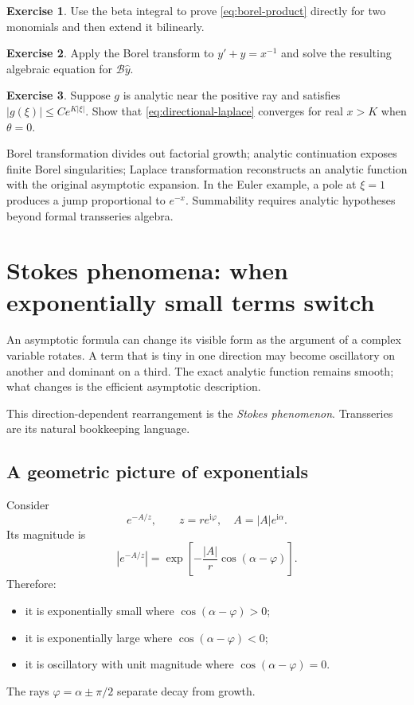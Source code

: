 \documentclass[11pt,openany]{book}
\theoremstyle{definition}
\newtheorem{exercise}{Exercise}[chapter]
\theoremstyle{plain}
\theoremstyle{remark}
\newcommand{\ii}{\mathrm{i}}
\newcommand{\trans}[1]{\widehat{#1}}
\newcommand{\Borel}{\mathcal{B}}
\begin{document}
\begin{exercise}
Use the beta integral to prove \eqref{eq:borel-product} directly for two monomials and then extend it bilinearly.
\end{exercise}

\begin{exercise}
Apply the Borel transform to $y'+y=x^{-1}$ and solve the resulting algebraic equation for $\Borel\trans y$.
\end{exercise}

\begin{exercise}
Suppose $g$ is analytic near the positive ray and satisfies $|g(\xi)|\le Ce^{K|\xi|}$. Show that \eqref{eq:directional-laplace} converges for real $x>K$ when $\theta=0$.
\end{exercise}

\begin{summarybox}
Borel transformation divides out factorial growth; analytic continuation exposes finite Borel singularities; Laplace transformation reconstructs an analytic function with the original asymptotic expansion. In the Euler example, a pole at $\xi=1$ produces a jump proportional to $e^{-x}$. Summability requires analytic hypotheses beyond formal transseries algebra.
\end{summarybox}


\chapter{Stokes phenomena: when exponentially small terms switch}\label{ch:stokes}

An asymptotic formula can change its visible form as the argument of a complex variable rotates. A term that is tiny in one direction may become oscillatory on another and dominant on a third. The exact analytic function remains smooth; what changes is the efficient asymptotic description.

This direction-dependent rearrangement is the \emph{Stokes phenomenon}. Transseries are its natural bookkeeping language.

\section{A geometric picture of exponentials}

Consider
\begin{equation}\label{eq:stokes-exponential}
 e^{-A/z},
 \qquad z=re^{\ii\varphi},\quad A=|A|e^{\ii\alpha}.
\end{equation}
Its magnitude is
\begin{equation}\label{eq:stokes-magnitude}
 \left|e^{-A/z}\right|
 =\exp\left[-\frac{|A|}{r}\cos(\alpha-\varphi)\right].
\end{equation}
Therefore:
\begin{itemize}
 \item it is exponentially small where $\cos(\alpha-\varphi)>0$;
 \item it is exponentially large where $\cos(\alpha-\varphi)<0$;
 \item it is oscillatory with unit magnitude where $\cos(\alpha-\varphi)=0$.
\end{itemize}
The rays $\varphi=\alpha\pm\pi/2$ separate decay from growth.
\end{document}
